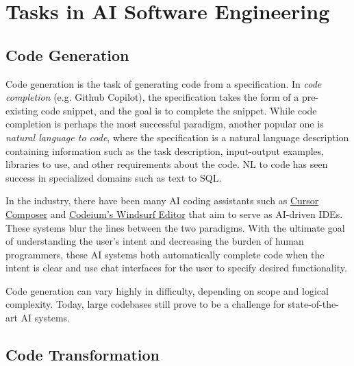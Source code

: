 \section{Tasks in AI Software Engineering}

\subsection{Code Generation}

Code generation is the task of generating code from a specification. In \textit{code completion} (e.g. Github Copilot), the specification takes the form of a pre-existing code snippet, and the goal is to complete the snippet. While code completion is perhaps the most successful paradigm, another popular one is \textit{natural language to code}, where the specification is a natural language description containing information such as the task description, input-output examples, libraries to use, and other requirements about the code. NL to code has seen success in specialized domains such as text to SQL.

In the industry, there have been many AI coding assistants such as \href{https://docs.cursor.com/composer}{Cursor Composer} and \href{https://codeium.com/windsurf}{Codeium's Windsurf Editor} that aim to serve as AI-driven IDEs. These systems blur the lines between the two paradigms. With the ultimate goal of understanding the user's intent and decreasing the burden of human programmers, these AI systems both automatically complete code when the intent is clear and use chat interfaces for the user to specify desired functionality.

Code generation can vary highly in difficulty, depending on scope and logical complexity. Today, large codebases still prove to be a challenge for state-of-the-art AI systems. 





\subsection{Code Transformation}

